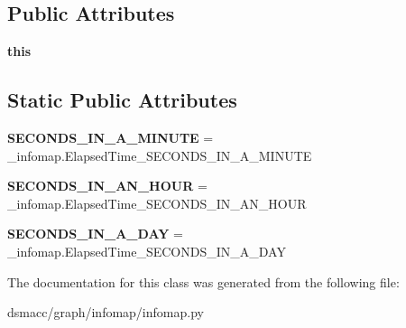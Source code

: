 \subsection*{Public Attributes}
\begin{DoxyCompactItemize}
\item 
\mbox{\label{classdsmacc_1_1graph_1_1infomap_1_1infomap_1_1ElapsedTime_a43469770ff59a74f9ae9bb1b2e4adb3c}} 
{\bfseries this}
\end{DoxyCompactItemize}
\subsection*{Static Public Attributes}
\begin{DoxyCompactItemize}
\item 
\mbox{\label{classdsmacc_1_1graph_1_1infomap_1_1infomap_1_1ElapsedTime_abeab120546a24beaa1da53c060b9aee2}} 
{\bfseries S\+E\+C\+O\+N\+D\+S\+\_\+\+I\+N\+\_\+\+A\+\_\+\+M\+I\+N\+U\+TE} = \+\_\+infomap.\+Elapsed\+Time\+\_\+\+S\+E\+C\+O\+N\+D\+S\+\_\+\+I\+N\+\_\+\+A\+\_\+\+M\+I\+N\+U\+TE
\item 
\mbox{\label{classdsmacc_1_1graph_1_1infomap_1_1infomap_1_1ElapsedTime_a7c8820d1632e6fa80ded9ab7eef3c43b}} 
{\bfseries S\+E\+C\+O\+N\+D\+S\+\_\+\+I\+N\+\_\+\+A\+N\+\_\+\+H\+O\+UR} = \+\_\+infomap.\+Elapsed\+Time\+\_\+\+S\+E\+C\+O\+N\+D\+S\+\_\+\+I\+N\+\_\+\+A\+N\+\_\+\+H\+O\+UR
\item 
\mbox{\label{classdsmacc_1_1graph_1_1infomap_1_1infomap_1_1ElapsedTime_ad7da644afde2927afbd33f7a92a9f811}} 
{\bfseries S\+E\+C\+O\+N\+D\+S\+\_\+\+I\+N\+\_\+\+A\+\_\+\+D\+AY} = \+\_\+infomap.\+Elapsed\+Time\+\_\+\+S\+E\+C\+O\+N\+D\+S\+\_\+\+I\+N\+\_\+\+A\+\_\+\+D\+AY
\end{DoxyCompactItemize}


The documentation for this class was generated from the following file\+:\begin{DoxyCompactItemize}
\item 
dsmacc/graph/infomap/infomap.\+py\end{DoxyCompactItemize}
